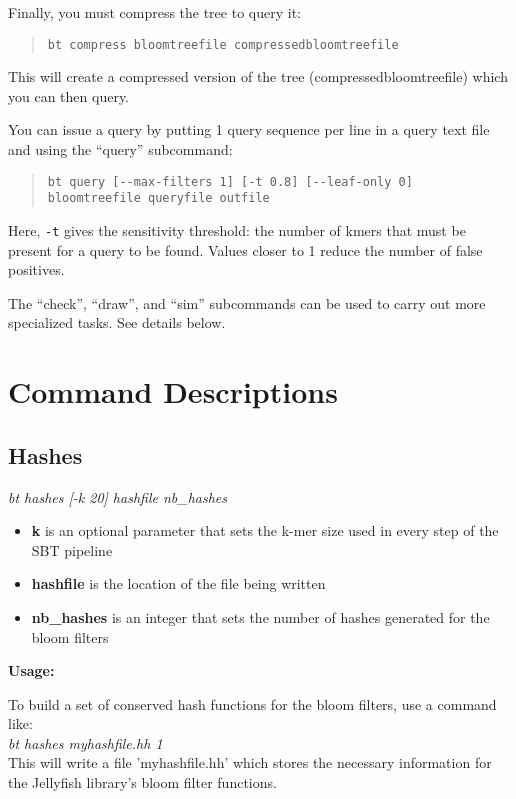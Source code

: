 \documentclass{article}
\begin{document}
Finally, you must compress the tree to query it:
\begin{quote}
\begin{verbatim}
bt compress bloomtreefile compressedbloomtreefile
\end{verbatim}
\end{quote}
This will create a compressed version of the tree (compressedbloomtreefile) which you can then query.

You can issue a query by putting 1 query sequence per line in a query text file and using the ``query'' subcommand:
\begin{quote}
\begin{verbatim}
bt query [--max-filters 1] [-t 0.8] [--leaf-only 0] bloomtreefile queryfile outfile
\end{verbatim}
\end{quote}
Here, \verb+-t+ gives the sensitivity threshold: the number of kmers that must be present for a query to be found. Values closer to 1 reduce the number of false positives. 

The ``check'', ``draw'', and ``sim'' subcommands can be used to carry out more specialized tasks. See details below.

\section{Command Descriptions}

\subsection{Hashes} 
\textit{bt hashes [-k 20] hashfile nb\_hashes}
\begin{itemize}
\item \textbf{k} is an optional parameter that sets the k-mer size used in every step of the SBT pipeline
\item \textbf{hashfile} is the location of the file being written
\item \textbf{nb\_hashes} is an integer that sets the number of hashes generated for the bloom filters
\end{itemize}
\textbf{Usage:}

To build a set of conserved hash functions for the bloom filters, use a command like: \\

\textit{bt hashes myhashfile.hh 1} \\

This will write a file 'myhashfile.hh' which stores the necessary information for the Jellyfish library's bloom filter functions.
\end{document}
